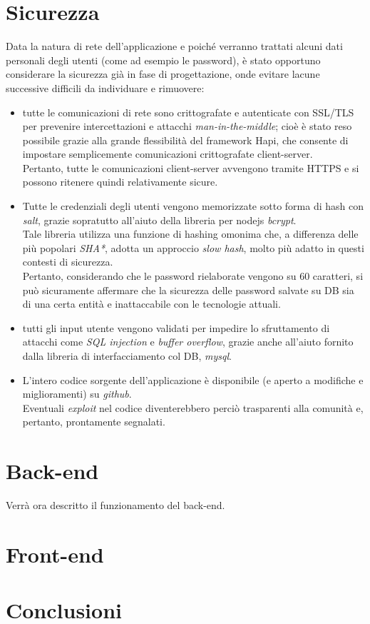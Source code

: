 \documentclass[11pt]{report}
\begin{document}
\section{Sicurezza}
Data la natura di rete dell'applicazione e poiché verranno trattati alcuni dati personali degli utenti (come ad esempio le password), è stato opportuno considerare la sicurezza già in fase di progettazione, onde evitare lacune successive difficili da individuare e rimuovere:
\begin{itemize}
	\item tutte le comunicazioni di rete sono crittografate e autenticate con SSL/TLS per prevenire intercettazioni e attacchi \textit{man-in-the-middle}; cioè è stato reso possibile grazie alla grande flessibilità del framework Hapi, che consente di impostare semplicemente comunicazioni crittografate client-server.
	\\ Pertanto, tutte le comunicazioni client-server avvengono tramite HTTPS e si possono ritenere quindi relativamente sicure.
	\item Tutte le credenziali degli utenti vengono memorizzate sotto forma di hash con \textit{salt}, grazie sopratutto all'aiuto della libreria per nodejs \textit{bcrypt}.
	\\Tale libreria utilizza una funzione di hashing omonima che, a differenza delle più popolari \textit{SHA*}, adotta un approccio \textit{slow hash}, molto più adatto in questi contesti di sicurezza.
	\\ Pertanto, considerando che le password rielaborate vengono su 60 caratteri, si può sicuramente affermare che la
	sicurezza delle password salvate su DB sia di una certa entità e inattaccabile con le tecnologie attuali.
	\item tutti gli input utente vengono validati per impedire lo sfruttamento di attacchi come \textit{SQL injection} e \textit{buffer overflow}, grazie anche all'aiuto fornito dalla libreria di interfacciamento col DB, \textit{mysql}.
	\item L'intero codice sorgente dell'applicazione è disponibile (e aperto a modifiche e miglioramenti) su \textit{github}.\\Eventuali \textit{exploit} nel codice diventerebbero perciò trasparenti alla comunità e, pertanto, prontamente segnalati.
\end{itemize}
\pagebreak

\section{Back-end}
Verrà ora descritto il funzionamento del back-end.

\section{Front-end}

\section{Conclusioni}
\end{document}
